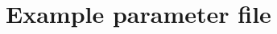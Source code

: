 \documentclass[]{report}
\begin{document}
%



%
%


\appendix

\chapter{Example parameter file}\label{chp:ExampleParam}
\end{document}

